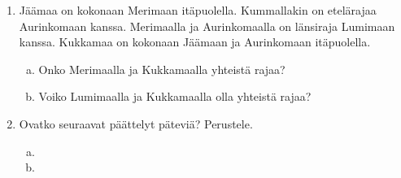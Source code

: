 \begin{enumerate}
    \newpage
    \item Jäämaa on kokonaan Merimaan itäpuolella.
        Kummallakin on etelärajaa Aurinkomaan kanssa.
        Merimaalla ja Aurinkomaalla on länsiraja Lumimaan kanssa.
        Kukkamaa on kokonaan Jäämaan ja Aurinkomaan itäpuolella.
        \begin{enumerate}[a)]
            \item Onko Merimaalla ja Kukkamaalla yhteistä rajaa?
            \item Voiko Lumimaalla ja Kukkamaalla olla yhteistä rajaa?
        \end{enumerate}
    \item Ovatko seuraavat päättelyt päteviä? Perustele.
        \begin{enumerate}[a)]
            \item {}
            \item {}
        \end{enumerate}
\end{enumerate}
